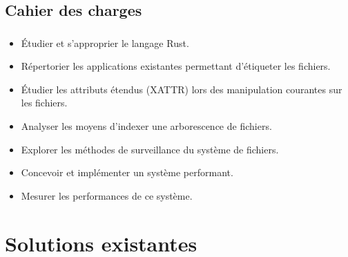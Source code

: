 \documentclass[10pt]{beamer}
\begin{document}
\subsection{Cahier des charges}
\begin{frame}
    \frametitle{\subsecname}
    \begin{itemize}
        \item Étudier et s'approprier le langage Rust.
        \pause
        \item Répertorier les applications existantes permettant d'étiqueter les fichiers.
        \pause
        \item Étudier les attributs étendus (XATTR) lors des manipulation courantes sur les fichiers.
        \pause
        \item Analyser les moyens d'indexer une arborescence de fichiers.
        \pause
        \item Explorer les méthodes de surveillance du système de fichiers.
        \pause
        \item Concevoir et implémenter un système performant.
        \pause
        \item Mesurer les performances de ce système.
    \end{itemize}
\end{frame}

\section{Solutions existantes}
\end{document}
